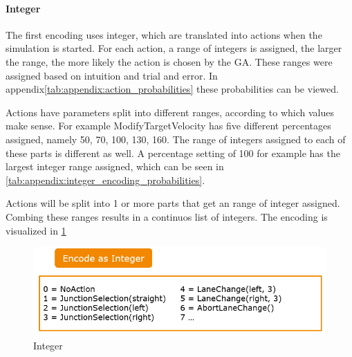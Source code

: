 \paragraph{Integer}
The first encoding uses integer, which are translated into actions when the simulation is started. For each action, a range of integers is assigned, the larger the range, the more likely the action is chosen by the GA. These ranges were assigned based on intuition and trial and error. In appendix\ref{tab:appendix:action_probabilities} these probabilities can be viewed.

Actions have parameters split into different ranges, according to which values make sense. For example ModifyTargetVelocity has five different percentages assigned, namely 50, 70, 100, 130, 160. The range of integers assigned to each of these parts is different as well. A percentage setting of 100 for example has the largest integer range assigned, which can be seen in \ref{tab:appendix:integer_encoding_probabilities}.

Actions will be split into 1 or more parts that get an range of integer assigned. Combing these ranges results in a continuos list of integers.
The encoding is visualized in \ref{fig:implementation:encoding_gene_int}

\begin{figure}[ht] 
	\includegraphics[width=1\linewidth]{figures/int_encoding}
	\caption{Integer}
	\label{fig:implementation:encoding_gene_int}
\end{figure}

